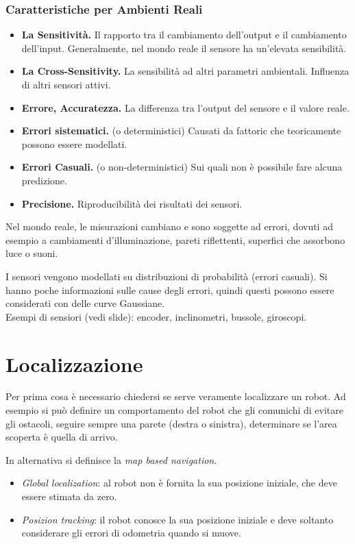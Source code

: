 \documentclass[a4paper,portrait,12pt]{article}
\theoremstyle{definition}
\begin{document}
\subsubsection{Caratteristiche per Ambienti Reali}
\begin{itemize}
\item \textbf{La Sensitività.} Il rapporto tra il cambiamento dell'output e il cambiamento dell'input.
Generalmente, nel mondo reale il sensore ha un'elevata sensibilità.
\item \textbf{La Cross-Sensitivity.} La sensibilità ad altri parametri ambientali.
Influenza di altri sensori attivi.
\item \textbf{Errore, Accuratezza.} La differenza tra l'output del sensore e il valore reale.
\item \textbf{Errori sistematici.} (o deterministici) Causati da fattoric che teoricamente possono essere modellati. 
\item \textbf{Errori Casuali.} (o non-deterministici) Sui quali non è possibile fare alcuna predizione.
\item \textbf{Precisione.} Riproducibilità dei risultati dei sensori.
\end{itemize}

Nel mondo reale, le misurazioni cambiano e sono soggette ad errori, dovuti ad esempio a cambiamenti d'illuminazione, pareti riflettenti, superfici che assorbono luce o suoni.

I sensori vengono modellati su distribuzioni di probabilità (errori casuali).
Si hanno poche informazioni sulle cause degli errori, quindi questi possono essere considerati con delle curve Gaussiane.\\

Esempi di sensiori (vedi slide): encoder, inclinometri, bussole, giroscopi.



\section{Localizzazione}

Per prima cosa è necessario chiedersi se serve veramente localizzare un robot.
Ad esempio si può definire un comportamento del robot che gli comunichi di evitare gli ostacoli, seguire sempre una parete (destra o sinistra), determinare se l'area scoperta è quella di arrivo.

In alternativa si definisce la \emph{map based navigation}.
\begin{itemize}
\item \emph{Global localization}: al robot non è fornita la sua posizione iniziale, che deve essere stimata da zero.
\item \emph{Posizion tracking}: il robot conosce la sua posizione iniziale e deve soltanto considerare gli errori di odometria quando si muove.
\end{itemize}
\end{document}
